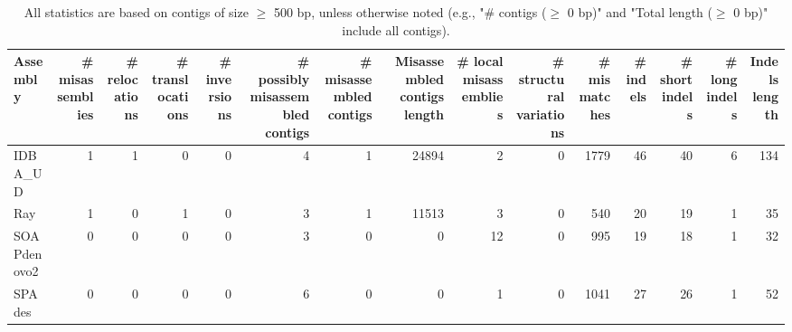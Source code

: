 \documentclass[12pt,a4paper]{article}
\begin{document}
\begin{table}[ht]
\begin{center}
\caption{All statistics are based on contigs of size $\geq$ 500 bp, unless otherwise noted (e.g., "\# contigs ($\geq$ 0 bp)" and "Total length ($\geq$ 0 bp)" include all contigs).}
\begin{tabular}{|l*{14}{|r}|}
\hline
Assembly & \# misassemblies &     \# relocations &     \# translocations &     \# inversions & \# possibly misassembled contigs & \# misassembled contigs & Misassembled contigs length & \# local misassemblies & \# structural variations & \# mismatches & \# indels &     \# short indels &     \# long indels & Indels length \\ \hline
IDBA\_UD & 1 & 1 & 0 & 0 & 4 & 1 & 24894 & 2 & 0 & 1779 & 46 & 40 & 6 & 134 \\ \hline
Ray & 1 & 0 & 1 & 0 & 3 & 1 & 11513 & 3 & 0 & 540 & 20 & 19 & 1 & 35 \\ \hline
SOAPdenovo2 & 0 & 0 & 0 & 0 & 3 & 0 & 0 & 12 & 0 & 995 & 19 & 18 & 1 & 32 \\ \hline
SPAdes & 0 & 0 & 0 & 0 & 6 & 0 & 0 & 1 & 0 & 1041 & 27 & 26 & 1 & 52 \\ \hline
\end{tabular}
\end{center}
\end{table}
\end{document}
